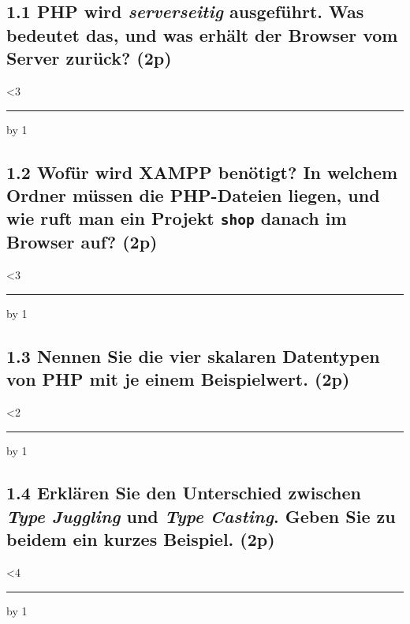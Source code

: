 \documentclass[a4paper,12pt]{article}
\newif\ifsolution
\newcommand{\antwort}[2]{%
  \ifsolution
    \par\smallskip{\color{sol}\textbf{Lösung:} #2}\par\medskip
  \else
    \par\vspace{0.3cm}%
    \answerlines{#1}%
  \fi}
\newcommand{\answerlines}[1]{%
  \linecount=0
  \loop\ifnum\linecount<#1
    \vspace{0.75cm}\noindent\rule{\linewidth}{0.4pt}\par
    \advance\linecount by 1
  \repeat\par\medskip}
\newcommand{\pt}[1]{\hfill\textbf{(#1p)}}
\begin{document}
\subsection*{1.1 \normalsize\mdseries PHP wird \emph{serverseitig} ausgeführt. Was bedeutet das, und was erhält der Browser vom Server zurück? \pt{2}}
\antwort{3}{Der PHP-Code wird auf dem Webserver ausgeführt, nicht im Browser. Der Browser erhält nur das Ergebnis, also fertiges HTML (ggf. mit CSS/JS). Den PHP-Quellcode sieht er nie. (1p Ausführung auf Server, 1p Browser erhält HTML)}

\subsection*{1.2 \normalsize\mdseries Wofür wird XAMPP benötigt? In welchem Ordner müssen die PHP-Dateien liegen, und wie ruft man ein Projekt \texttt{shop} danach im Browser auf? \pt{2}}
\antwort{3}{XAMPP liefert einen lokalen Webserver (Apache) mit PHP (und MySQL/MariaDB), damit PHP-Dateien ausgeführt werden können (1p). Dateien liegen im Ordner \texttt{htdocs}, Aufruf über \texttt{http://localhost/shop/} (1p).}

\subsection*{1.3 \normalsize\mdseries Nennen Sie die vier skalaren Datentypen von PHP mit je einem Beispielwert. \pt{2}}
\antwort{2}{\texttt{string} (\texttt{"Hallo"}), \texttt{int} (\texttt{24}), \texttt{float} (\texttt{19.95}), \texttt{bool} (\texttt{true}). Je ½p.}

\subsection*{1.4 \normalsize\mdseries Erklären Sie den Unterschied zwischen \emph{Type Juggling} und \emph{Type Casting}. Geben Sie zu beidem ein kurzes Beispiel. \pt{2}}
\antwort{4}{Type Juggling: PHP wandelt Typen bei Bedarf \emph{automatisch} um, z.B. \texttt{"10" + 5} ergibt \texttt{int(15)} (1p). Type Casting: Man wandelt einen Wert \emph{gezielt selbst} um, z.B. \texttt{(int) "42"} (1p).}
\end{document}
